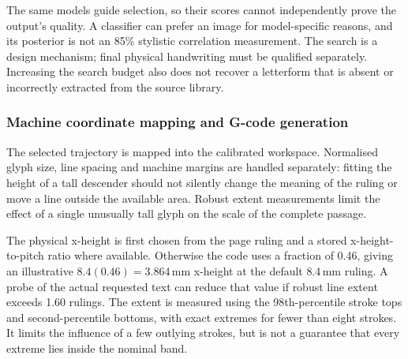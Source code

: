 The same models guide selection, so their scores cannot independently prove the output's quality. A classifier can prefer an image for model-specific reasons, and its posterior is not an 85\% stylistic correlation measurement. The search is a design mechanism; final physical handwriting must be qualified separately. Increasing the search budget also does not recover a letterform that is absent or incorrectly extracted from the source library.

\subsubsection{Machine coordinate mapping and G-code generation}
\label{sec:des-gcode}
The selected trajectory is mapped into the calibrated workspace. Normalised glyph size, line spacing and machine margins are handled separately: fitting the height of a tall descender should not silently change the meaning of the ruling or move a line outside the available area. Robust extent measurements limit the effect of a single unusually tall glyph on the scale of the complete passage.

The physical x-height is first chosen from the page ruling and a stored x-height-to-pitch ratio where available. Otherwise the code uses a fraction of 0.46, giving an illustrative $8.4(0.46)=3.864$\,mm x-height at the default 8.4\,mm ruling. A probe of the actual requested text can reduce that value if robust line extent exceeds 1.60 rulings. The extent is measured using the 98th-percentile stroke tops and second-percentile bottoms, with exact extremes for fewer than eight strokes. It limits the influence of a few outlying strokes, but is not a guarantee that every extreme lies inside the nominal band.

